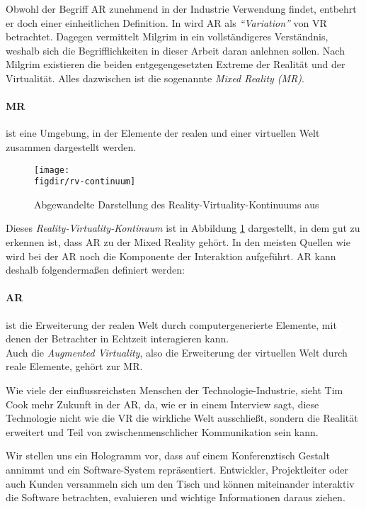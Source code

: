 Obwohl der Begriff AR zunehmend in der Industrie Verwendung findet, entbehrt er doch einer einheitlichen Definition. In \cite{azuma1997survey} wird AR als \emph{"`Variation"'} von VR betrachtet. Dagegen vermittelt Milgrim in \cite{milgram1995augmented} ein vollständigeres Verständnis, weshalb sich die Begrifflichkeiten in dieser Arbeit daran anlehnen sollen. Nach Milgrim existieren die beiden entgegengesetzten Extreme der Realität und der Virtualität. Alles dazwischen ist die sogenannte \emph{Mixed Reality (MR)}.

\paragraph{MR} ist eine Umgebung, in der Elemente der realen und einer virtuellen Welt zusammen dargestellt werden.\\

\begin{figure}[htb]
  \texttt{[image: \\figdir/rv-continuum]}
  \caption{Abgewandelte Darstellung des Reality-Virtuality-Kontinuums aus \cite{milgram1995augmented}}
  \label{fig:rv-continuum}
\end{figure}

Dieses \emph{Reality-Virtuality-Kontinuum} ist in Abbildung \ref{fig:rv-continuum} dargestellt, in dem gut zu erkennen ist, dass AR zu der Mixed Reality gehört. In den meisten Quellen wie \cite{azuma1997survey}\cite{azuma2001recent}\cite{kato1999marker} wird bei der AR noch die Komponente der Interaktion aufgeführt. AR kann deshalb folgendermaßen definiert werden:

\paragraph{AR} ist die Erweiterung der realen Welt durch computergenerierte Elemente, mit denen der Betrachter in Echtzeit interagieren kann.\\

Auch die \emph{Augmented Virtuality}, also die Erweiterung der virtuellen Welt durch reale Elemente, gehört zur MR.

Wie viele der einflussreichsten Menschen der Technologie-Industrie, sieht Tim Cook  mehr Zukunft in der AR, da, wie er in einem Interview sagt, diese Technologie nicht wie die VR die wirkliche Welt ausschließt, sondern die Realität erweitert und Teil von zwischenmenschlicher Kommunikation sein kann. \cite{theindependent2017apple}

Wir stellen uns ein Hologramm vor, dass auf einem Konferenztisch Gestalt annimmt und ein Software-System repräsentiert. Entwickler, Projektleiter oder auch Kunden versammeln sich um den Tisch und können miteinander interaktiv die Software betrachten, evaluieren und wichtige Informationen daraus ziehen.

